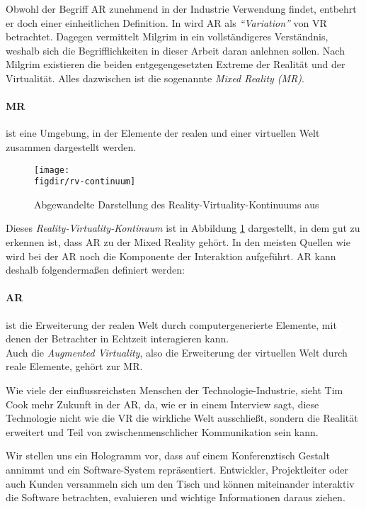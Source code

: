 Obwohl der Begriff AR zunehmend in der Industrie Verwendung findet, entbehrt er doch einer einheitlichen Definition. In \cite{azuma1997survey} wird AR als \emph{"`Variation"'} von VR betrachtet. Dagegen vermittelt Milgrim in \cite{milgram1995augmented} ein vollständigeres Verständnis, weshalb sich die Begrifflichkeiten in dieser Arbeit daran anlehnen sollen. Nach Milgrim existieren die beiden entgegengesetzten Extreme der Realität und der Virtualität. Alles dazwischen ist die sogenannte \emph{Mixed Reality (MR)}.

\paragraph{MR} ist eine Umgebung, in der Elemente der realen und einer virtuellen Welt zusammen dargestellt werden.\\

\begin{figure}[htb]
  \texttt{[image: \\figdir/rv-continuum]}
  \caption{Abgewandelte Darstellung des Reality-Virtuality-Kontinuums aus \cite{milgram1995augmented}}
  \label{fig:rv-continuum}
\end{figure}

Dieses \emph{Reality-Virtuality-Kontinuum} ist in Abbildung \ref{fig:rv-continuum} dargestellt, in dem gut zu erkennen ist, dass AR zu der Mixed Reality gehört. In den meisten Quellen wie \cite{azuma1997survey}\cite{azuma2001recent}\cite{kato1999marker} wird bei der AR noch die Komponente der Interaktion aufgeführt. AR kann deshalb folgendermaßen definiert werden:

\paragraph{AR} ist die Erweiterung der realen Welt durch computergenerierte Elemente, mit denen der Betrachter in Echtzeit interagieren kann.\\

Auch die \emph{Augmented Virtuality}, also die Erweiterung der virtuellen Welt durch reale Elemente, gehört zur MR.

Wie viele der einflussreichsten Menschen der Technologie-Industrie, sieht Tim Cook  mehr Zukunft in der AR, da, wie er in einem Interview sagt, diese Technologie nicht wie die VR die wirkliche Welt ausschließt, sondern die Realität erweitert und Teil von zwischenmenschlicher Kommunikation sein kann. \cite{theindependent2017apple}

Wir stellen uns ein Hologramm vor, dass auf einem Konferenztisch Gestalt annimmt und ein Software-System repräsentiert. Entwickler, Projektleiter oder auch Kunden versammeln sich um den Tisch und können miteinander interaktiv die Software betrachten, evaluieren und wichtige Informationen daraus ziehen.

